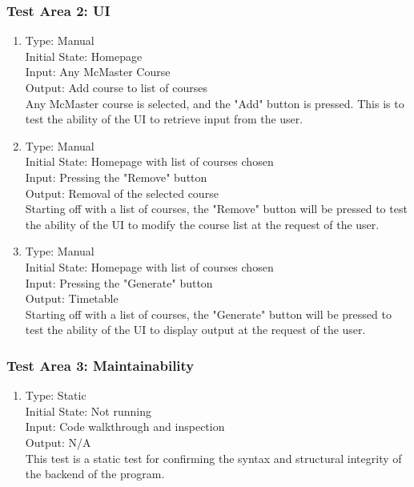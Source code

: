 \documentclass[11pt, oneside]{article}   	%
\begin{document}
\subsubsection{Test Area 2: UI}
\begin{enumerate}

\item Type: Manual \\
Initial State: Homepage \\
Input: Any McMaster Course \\
Output: Add course to list of courses \\
Any McMaster course is selected, and the "Add" button is pressed. This is to test the ability of the UI to retrieve input from the user. \\

\item Type: Manual \\
Initial State: Homepage with list of courses chosen\\
Input:  Pressing the "Remove" button \\
Output: Removal of the selected course \\
Starting off with a list of courses, the "Remove" button will be pressed to test the ability of the UI to modify the course list at the request of the user.  \\


\item Type: Manual \\
Initial State: Homepage with list of courses chosen\\
Input:  Pressing the "Generate" button \\
Output: Timetable \\
Starting off with a list of courses, the "Generate" button will be pressed to test the ability of the UI to display output at the request of the user.  \\
\end{enumerate}

\subsubsection{Test Area 3: Maintainability}
\begin{enumerate}
\item Type: Static \\
Initial State: Not running \\
Input: Code walkthrough and inspection\\
Output: N/A  \\
This test is a static test for confirming the syntax and structural integrity of the backend of the program.\\
\end{enumerate}
\end{document}
